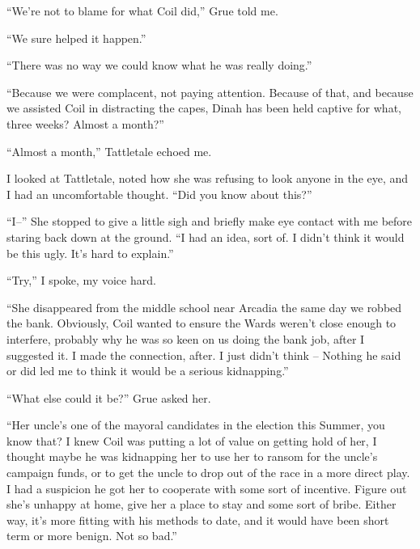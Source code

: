 





``We're not to blame for what Coil did,'' Grue told me.



``We sure helped it happen.''



``There was no way we could know what he was really doing.''



``Because we were complacent, not paying attention.  Because of that, and because we assisted Coil in distracting the capes, Dinah has been held captive for what, three weeks?  Almost a month?''



``Almost a month,'' Tattletale echoed me.



I looked at Tattletale, noted how she was refusing to look anyone in the eye, and I had an uncomfortable thought.  ``Did you know about this?''



``I--'' She stopped to give a little sigh and briefly make eye contact with me before staring back down at the ground.  ``I had an idea, sort of.  I didn't think it would be this ugly.  It's hard to explain.''



``Try,'' I spoke, my voice hard.



``She disappeared from the middle school near Arcadia the same day we robbed the bank.  Obviously, Coil wanted to ensure the Wards weren't close enough to interfere, probably why he was so keen on us doing the bank job, after I suggested it.  I made the connection, after.  I just didn't think – Nothing he said or did led me to think it would be a serious kidnapping.''



``What else could it be?'' Grue asked her.



``Her uncle's one of the mayoral candidates in the election this Summer, you know that?  I knew Coil was putting a lot of value on getting hold of her, I thought maybe he was kidnapping her to use her to ransom for the uncle's campaign funds, or to get the uncle to drop out of the race in a more direct play.  I had a suspicion he got her to cooperate with some sort of incentive.  Figure out she's unhappy at home, give her a place to stay and some sort of bribe.  Either way, it's more fitting with his methods to date, and it would have been short term or more benign.  Not so bad.''



